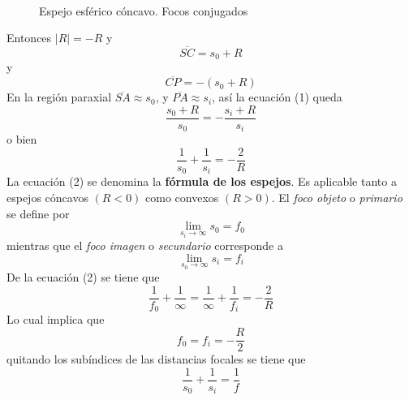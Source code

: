 \documentclass[13,twocolumn,letterpaper]{article}
\begin{document}
{\begin{figure}
\begin{minipage}[b]{0.42\textwidth}
	\begin{center}
		\\
		\caption{Espejo esférico cóncavo. Focos conjugados }
	\end{center}
\end{minipage}
\end{figure}

Entonces $|R|=-R$ y 
$$\overline{SC}=s_0+R$$
y $$\overline{CP}=-(s_{0}+R)$$
En la región paraxial $\overline{SA}\approx s_{0}$, y $\overline{PA}\approx s_{i}$, así la ecuación (1) queda
$$\dfrac{s_{0}+R}{s_{0}}=-\dfrac{s_{i}+R}{s_{i}}$$
o bien 
\begin{equation}
\dfrac{1}{s_{0}}+\dfrac{1}{s_{i}}=-\dfrac{2}{R}
\end{equation}
La ecuación (2) se denomina la \textbf{fórmula de los espejos}. Es aplicable tanto a espejos cóncavos $(R<0)$ como convexos $(R>0)$. El \emph{foco objeto } o \emph{primario} se define por 
$$\lim_{s_{i}\rightarrow\infty}s_{0}=f_{0}$$
mientras que el \emph{foco imagen} o \emph{secundario} corresponde a 
$$\lim_{s_{0}\rightarrow\infty}s_{i}=f_{i}$$
De la ecuación (2) se tiene que 
$$\dfrac{1}{f_{0}}+\dfrac{1}{\infty}=\dfrac{1}{\infty}+\dfrac{1}{f_{i}}=-\dfrac{2}{R}$$
Lo cual implica que
\begin{equation}
f_{0}=f_{i}=-\dfrac{R}{2}
\end{equation}
quitando los subíndices de las distancias focales se tiene que 
\begin{equation}
\dfrac{1}{s_{0}}+\dfrac{1}{s_{i}}=\dfrac{1}{f}
\end{equation}
}
\end{document}
